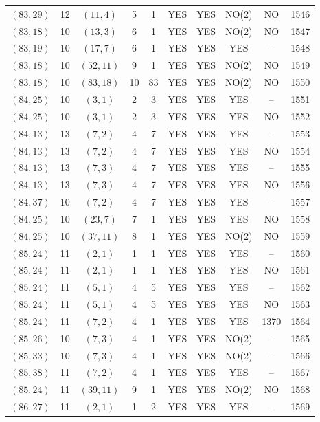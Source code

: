 \begin{longtable}{|c|c|c|c|c|c|c|c|c|c|}
$(83, 29)$ & 12 & $(11, 4)$ & 5 & 1 & YES & YES & NO(2) & NO & 1546\\
$(83, 18)$ & 10 & $(13, 3)$ & 6 & 1 & YES & YES & NO(2) & NO & 1547\\
$(83, 19)$ & 10 & $(17, 7)$ & 6 & 1 & YES & YES & YES & -- & 1548\\
$(83, 18)$ & 10 & $(52, 11)$ & 9 & 1 & YES & YES & NO(2) & NO & 1549\\
$(83, 18)$ & 10 & $(83, 18)$ & 10 & 83 & YES & YES & NO(2) & NO & 1550\\
$(84, 25)$ & 10 & $(3, 1)$ & 2 & 3 & YES & YES & YES & -- & 1551\\
$(84, 25)$ & 10 & $(3, 1)$ & 2 & 3 & YES & YES & YES & NO & 1552\\
$(84, 13)$ & 13 & $(7, 2)$ & 4 & 7 & YES & YES & YES & -- & 1553\\
$(84, 13)$ & 13 & $(7, 2)$ & 4 & 7 & YES & YES & YES & NO & 1554\\
$(84, 13)$ & 13 & $(7, 3)$ & 4 & 7 & YES & YES & YES & -- & 1555\\
$(84, 13)$ & 13 & $(7, 3)$ & 4 & 7 & YES & YES & YES & NO & 1556\\
$(84, 37)$ & 10 & $(7, 2)$ & 4 & 7 & YES & YES & YES & -- & 1557\\
$(84, 25)$ & 10 & $(23, 7)$ & 7 & 1 & YES & YES & YES & NO & 1558\\
$(84, 25)$ & 10 & $(37, 11)$ & 8 & 1 & YES & YES & NO(2) & NO & 1559\\
$(85, 24)$ & 11 & $(2, 1)$ & 1 & 1 & YES & YES & YES & -- & 1560\\
$(85, 24)$ & 11 & $(2, 1)$ & 1 & 1 & YES & YES & YES & NO & 1561\\
$(85, 24)$ & 11 & $(5, 1)$ & 4 & 5 & YES & YES & YES & -- & 1562\\
$(85, 24)$ & 11 & $(5, 1)$ & 4 & 5 & YES & YES & YES & NO & 1563\\
$(85, 24)$ & 11 & $(7, 2)$ & 4 & 1 & YES & YES & YES & 1370 & 1564\\
$(85, 26)$ & 10 & $(7, 3)$ & 4 & 1 & YES & YES & NO(2) & -- & 1565\\
$(85, 33)$ & 10 & $(7, 3)$ & 4 & 1 & YES & YES & NO(2) & -- & 1566\\
$(85, 38)$ & 11 & $(7, 2)$ & 4 & 1 & YES & YES & YES & -- & 1567\\
$(85, 24)$ & 11 & $(39, 11)$ & 9 & 1 & YES & YES & NO(2) & NO & 1568\\
$(86, 27)$ & 11 & $(2, 1)$ & 1 & 2 & YES & YES & YES & -- & 1569\\

\end{longtable}
